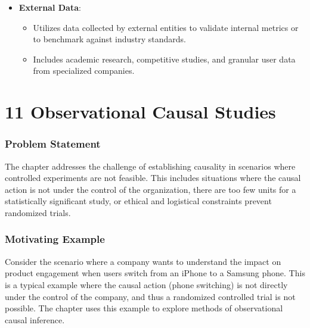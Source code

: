 \documentclass{article}
\begin{document}
\begin{itemize}
    \item \textbf{External Data}:
    \begin{itemize}
        \item Utilizes data collected by external entities to validate internal metrics or to benchmark against industry standards.
        \item Includes academic research, competitive studies, and granular user data from specialized companies.
    \end{itemize}
\end{itemize}

\section*{11 Observational Causal Studies}
\subsubsection*{Problem Statement}
The chapter addresses the challenge of establishing causality in scenarios where controlled experiments are not feasible. This includes situations where the causal action is not under the control of the organization, there are too few units for a statistically significant study, or ethical and logistical constraints prevent randomized trials.

\subsubsection*{Motivating Example}
Consider the scenario where a company wants to understand the impact on product engagement when users switch from an iPhone to a Samsung phone. This is a typical example where the causal action (phone switching) is not directly under the control of the company, and thus a randomized controlled trial is not possible. The chapter uses this example to explore methods of observational causal inference.
\end{document}
